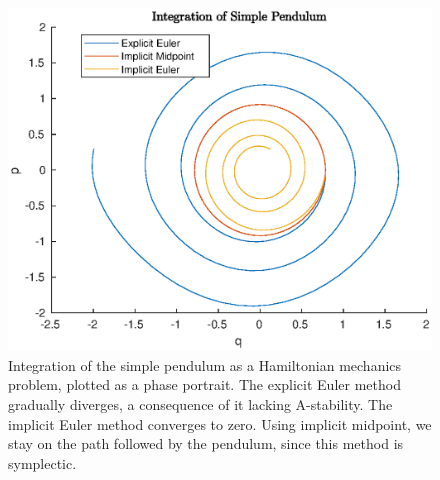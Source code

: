 \documentclass{report}
\theoremstyle{exampstyle} \newtheorem{example}[theorem]{Example}
\theoremstyle{exampstyle} \newtheorem{remark}[theorem]{Remark}
\theoremstyle{exampstyle} \newtheorem{definition}[theorem]{Definition}
\theoremstyle{exampstyle} \newtheorem{lemma}[theorem]{Lemma}
\begin{document}
\begin{figure}
	\centering
	\includegraphics[width=0.75\linewidth]{figures/pendulum.eps}
	\caption{
		Integration of the simple pendulum as a Hamiltonian mechanics problem, plotted as a phase portrait.
		The explicit Euler method gradually diverges, a consequence of it lacking A-stability.
		The implicit Euler method converges to zero.
		Using implicit midpoint, we stay on the path followed by the pendulum, since this method is symplectic.
	}
	\label{fig:pendulum}
\end{figure}
\end{document}
